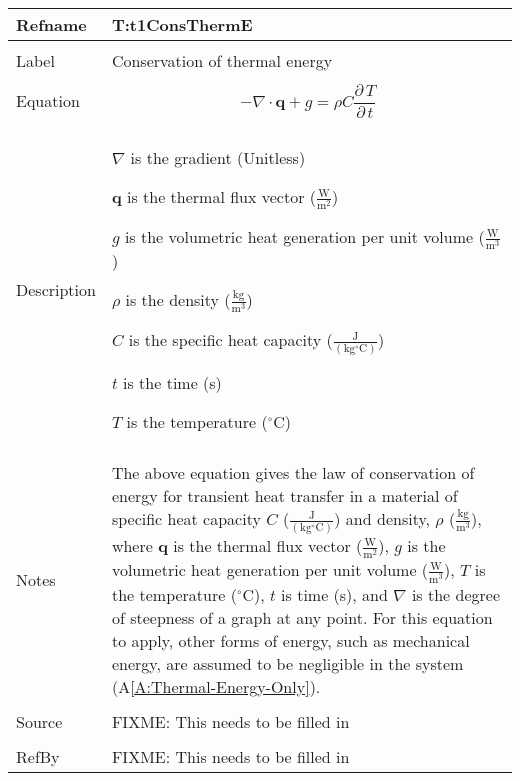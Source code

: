 \documentclass[12pt]{article}
\begin{document}
\noindent \begin{minipage}{\textwidth}
\begin{tabular}{p{} p{}}
\toprule \textbf{Refname} & \textbf{T:t1ConsThermE}
\label{T:t1ConsThermE}
\\ \midrule \\
Label & Conservation of thermal energy
\\ \midrule \\
Equation & \begin{dmath}
           -∇\cdot{}\mathbf{q}+g=ρ C \frac{\partial{}\,T}{\partial{}\,t}
           \end{dmath}
\\ \midrule \\
Description & \begin{symbDescription}
              \item{$∇$ is the gradient (Unitless)}
              \item{$\mathbf{q}$ is the thermal flux vector ($\frac{\text{W}}{\text{m}^{2}}$)}
              \item{$g$ is the volumetric heat generation per unit volume ($\frac{\text{W}}{\text{m}^{3}}$)}
              \item{$ρ$ is the density ($\frac{\text{kg}}{\text{m}^{3}}$)}
              \item{$C$ is the specific heat capacity ($\frac{\text{J}}{(\text{kg}{}^{\circ}\text{C})}$)}
              \item{$t$ is the time (s)}
              \item{$T$ is the temperature (${}^{\circ}$C)}
              \end{symbDescription}
\\ \midrule \\
Notes & The above equation gives the law of conservation of energy for transient heat transfer in a material of specific heat capacity $C$ ($\frac{\text{J}}{(\text{kg}{}^{\circ}\text{C})}$) and density, $ρ$ ($\frac{\text{kg}}{\text{m}^{3}}$), where $\mathbf{q}$ is the thermal flux vector ($\frac{\text{W}}{\text{m}^{2}}$), $g$ is the volumetric heat generation per unit volume ($\frac{\text{W}}{\text{m}^{3}}$), $T$ is the temperature (${}^{\circ}$C), $t$ is time (s), and $∇$ is the degree of steepness of a graph at any point. For this equation to apply, other forms of energy, such as mechanical energy, are assumed to be negligible in the system (A\ref{A:Thermal-Energy-Only}).
\\ \midrule \\
Source & FIXME: This needs to be filled in
\\ \midrule \\
RefBy & FIXME: This needs to be filled in
\\ \bottomrule \end{tabular}
\end{minipage}\\
\end{document}
